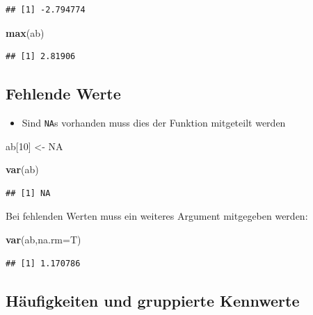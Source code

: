 \documentclass[]{article}
\newenvironment{Shaded}{\begin{snugshade}}{\end{snugshade}}
\newcommand{\KeywordTok}[1]{\textcolor[rgb]{0.13,0.29,0.53}{\textbf{{#1}}}}
\newcommand{\DataTypeTok}[1]{\textcolor[rgb]{0.13,0.29,0.53}{{#1}}}
\newcommand{\DecValTok}[1]{\textcolor[rgb]{0.00,0.00,0.81}{{#1}}}
\newcommand{\StringTok}[1]{\textcolor[rgb]{0.31,0.60,0.02}{{#1}}}
\newcommand{\OtherTok}[1]{\textcolor[rgb]{0.56,0.35,0.01}{{#1}}}
\newcommand{\NormalTok}[1]{{#1}}
\providecommand{\tightlist}{%
  \setlength{\itemsep}{0pt}\setlength{\parskip}{0pt}}
\begin{document}
\begin{verbatim}
## [1] -2.794774
\end{verbatim}

\begin{Shaded}
\begin{Highlighting}[]
\KeywordTok{max}\NormalTok{(ab)}
\end{Highlighting}
\end{Shaded}

\begin{verbatim}
## [1] 2.81906
\end{verbatim}

\subsection{Fehlende Werte}\label{fehlende-werte}

\begin{itemize}
\tightlist
\item
  Sind \texttt{NA}s vorhanden muss dies der Funktion mitgeteilt werden
\end{itemize}

\begin{Shaded}
\begin{Highlighting}[]
\NormalTok{ab[}\DecValTok{10}\NormalTok{] <-}\StringTok{ }\OtherTok{NA}

\KeywordTok{var}\NormalTok{(ab)}
\end{Highlighting}
\end{Shaded}

\begin{verbatim}
## [1] NA
\end{verbatim}

Bei fehlenden Werten muss ein weiteres Argument mitgegeben werden:

\begin{Shaded}
\begin{Highlighting}[]
\KeywordTok{var}\NormalTok{(ab,}\DataTypeTok{na.rm=}\NormalTok{T)}
\end{Highlighting}
\end{Shaded}

\begin{verbatim}
## [1] 1.170786
\end{verbatim}

\subsection{Häufigkeiten und gruppierte
Kennwerte}\label{haufigkeiten-und-gruppierte-kennwerte}
\end{document}
